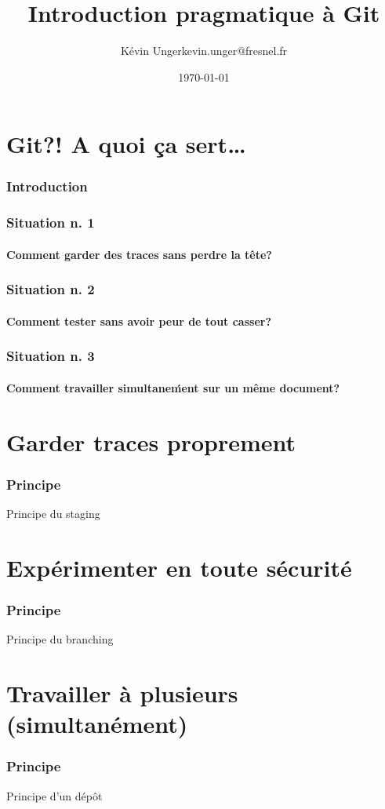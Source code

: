 \documentclass[t]{beamer}
\author{Kévin Unger\newline kevin.unger@fresnel.fr}
\date{\today}
\title{Introduction pragmatique à Git}
\begin{document}
\section{Git?! A quoi ça sert\ldots}
\frame{\titlepage}
\begin{frame}[label=intro]
        \frametitle{Introduction}
\end{frame}


\begin{frame}[label=sit1]
        \frametitle{Situation n. 1}
        \framesubtitle{Comment garder des traces sans perdre la tête?}
\end{frame}


\begin{frame}[label=sit2]
        \frametitle{Situation n. 2}
        \framesubtitle{Comment tester sans avoir peur de tout casser?}
\end{frame}


\begin{frame}[label=sit3]
        \frametitle{Situation n. 3}
        \framesubtitle{Comment travailler simultane\'ment sur un même document?}
\end{frame}

\section{Garder traces proprement}
\begin{frame}
        \frametitle{Principe}
        Principe du staging
\end{frame}

\section{Exp\'erimenter en toute s\'ecurit\'e}
\begin{frame}
        \frametitle{Principe}
        Principe du branching
\end{frame}

\section{Travailler \`a plusieurs (simultan\'ement) }
\begin{frame}
        \frametitle{Principe}
        Principe d'un d\'ep\^ot
\end{frame}
\end{document}
